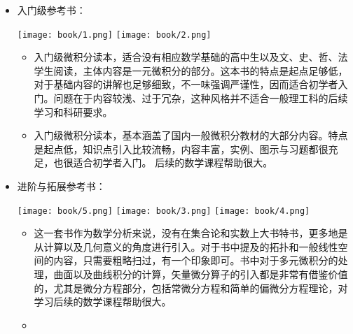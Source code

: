 \begin{itemize}
    \item 入门级参考书：

          \begin{center}
              \texttt{[image: book/1.png]} \quad
              \texttt{[image: book/2.png]} \quad
          \end{center}

          \begin{itemize}
              \item \textcite[普林斯顿微积分读本]{杨爽2010普林斯顿微积分读本}

                    入门级微积分读本，适合没有相应数学基础的高中生以及文、史、哲、法学生阅读，主体内容是一元微积分的部分。这本书的特点是起点足够低，对于基础内容的讲解也足够细致，不一味强调严谨性，因而适合初学者入门。问题在于内容较浅、过于冗杂，这种风格并不适合一般理工科的后续学习和科研要求。

              \item \textcite[托马斯大学微积分]{李伯民2009托马斯大学微积分}

                    入门级微积分读本，基本涵盖了国内一般微积分教材的大部分内容。特点是起点低，知识点引入比较流畅，内容丰富，实例、图示与习题都很充足，也很适合初学者入门。
                    后续的数学课程帮助很大。
          \end{itemize}

    \item 进阶与拓展参考书：
          \begin{center}
              \texttt{[image: book/5.png]} \quad
              \texttt{[image: book/3.png]} \quad
              \texttt{[image: book/4.png]}
          \end{center}
          \begin{itemize}
              \item \textcite[数学分析新讲]{张筑生数学分析}

                    这一套书作为数学分析来说，没有在集合论和实数上大书特书，更多地是从计算以及几何意义的角度进行引入。对于书中提及的拓扑和一般线性空间的内容，只需要粗略扫过，有一个印象即可。书中对于多元微积分的处理，曲面以及曲线积分的计算，矢量微分算子的引入都是非常有借鉴价值的，尤其是微分方程部分，包括常微分方程和简单的偏微分方程理论，对学习后续的数学课程帮助很大。

              \item \textcite[工程数学——矢量分析与场论]{谢树艺2015工程数学}


\end{itemize}
\end{itemize}
